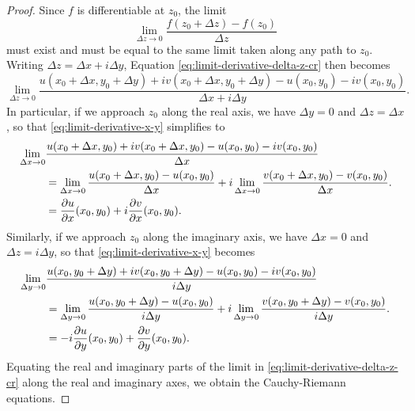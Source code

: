\begin{proof}
    Since \(f\) is differentiable at \(z_0\), the limit
    \begin{equation}
        \lim_{\Delta z \to 0} \frac{f(z_0 + \Delta z) - f(z_0)}{\Delta z}
        \label{eq:limit-derivative-delta-z-cr}
    \end{equation}
    must exist and must be equal to the same limit taken along any path to \(z_0\). Writing \(\Delta z = \Delta x + i\Delta y\), Equation \eqref{eq:limit-derivative-delta-z-cr} then becomes
    \begin{equation}
        \lim_{\Delta z \to 0} \frac{u(x_0 + \Delta x, y_0 + \Delta y) + iv(x_0 + \Delta x, y_0 + \Delta y) - u(x_0, y_0) - iv(x_0, y_0)}{\Delta x + i\Delta y}.
        \label{eq:limit-derivative-x-y}
    \end{equation}
    In particular, if we approach \(z_0\) along the real axis, we have \(\Delta y = 0\) and \(\Delta z = \Delta x\), so that \eqref{eq:limit-derivative-x-y} simplifies to
    \begin{align*}
        \lim_{\Delta x \to 0} &\frac{u(x_0 + \Delta x, y_0) + iv(x_0 + \Delta x, y_0) - u(x_0, y_0) - iv(x_0, y_0)}{\Delta x}\\
        &= \lim_{\Delta x \to 0} \frac{u(x_0 + \Delta x, y_0) - u(x_0, y_0)}{\Delta x} + i\lim_{\Delta x \to 0} \frac{v(x_0 + \Delta x, y_0) - v(x_0, y_0)}{\Delta x}.\\
        &= \frac{\partial u}{\partial x}(x_0, y_0) + i\frac{\partial v}{\partial x}(x_0, y_0).
    \end{align*}
    Similarly, if we approach \(z_0\) along the imaginary axis, we have \(\Delta x = 0\) and \(\Delta z = i\Delta y\), so that \eqref{eq:limit-derivative-x-y} becomes
    \begin{align*}
        \lim_{\Delta y \to 0} &\frac{u(x_0, y_0 + \Delta y) + iv(x_0, y_0 + \Delta y) - u(x_0, y_0) - iv(x_0, y_0)}{i\Delta y}\\
        &= \lim_{\Delta y \to 0} \frac{u(x_0, y_0 + \Delta y) - u(x_0, y_0)}{i\Delta y} + i\lim_{\Delta y \to 0} \frac{v(x_0, y_0 + \Delta y) - v(x_0, y_0)}{i\Delta y}.\\
        &= -i \frac{\partial u}{\partial y}(x_0, y_0) + \frac{\partial v}{\partial y}(x_0, y_0).
    \end{align*}
    Equating the real and imaginary parts of the limit in \eqref{eq:limit-derivative-delta-z-cr} along the real and imaginary axes, we obtain the Cauchy-Riemann equations.
\end{proof}

